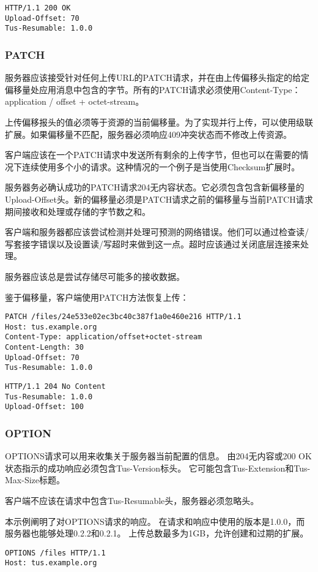 \documentclass[bachelor]{thesis-uestc}
\begin{document}
\begin{lstlisting}[title=Response]
HTTP/1.1 200 OK
Upload-Offset: 70
Tus-Resumable: 1.0.0
\end{lstlisting}

\subsubsection{PATCH}
服务器应该接受针对任何上传URL的PATCH请求，并在由上传偏移头指定的给定偏移量处应用消息中包含的字节。所有的PATCH请求必须使用Content-Type：application / offset + octet-stream。

上传偏移报头的值必须等于资源的当前偏移量。为了实现并行上传，可以使用级联扩展。如果偏移量不匹配，服务器必须响应409冲突状态而不修改上传资源。

客户端应该在一个PATCH请求中发送所有剩余的上传字节，但也可以在需要的情况下连续使用多个小的请求。这种情况的一个例子是当使用Checksum扩展时。

服务器务必确认成功的PATCH请求204无内容状态。它必须包含包含新偏移量的Upload-Offset头。新的偏移量必须是PATCH请求之前的偏移量与当前PATCH请求期间接收和处理或存储的字节数之和。

客户端和服务器都应该尝试检测并处理可预测的网络错误。他们可以通过检查读/写套接字错误以及设置读/写超时来做到这一点。超时应该通过关闭底层连接来处理。

服务器应该总是尝试存储尽可能多的接收数据。
\par 鉴于偏移量，客户端使用PATCH方法恢复上传：
\begin{lstlisting}[title=Request]
PATCH /files/24e533e02ec3bc40c387f1a0e460e216 HTTP/1.1
Host: tus.example.org
Content-Type: application/offset+octet-stream
Content-Length: 30
Upload-Offset: 70
Tus-Resumable: 1.0.0
\end{lstlisting}

\begin{lstlisting}[title=Response]
HTTP/1.1 204 No Content
Tus-Resumable: 1.0.0
Upload-Offset: 100
\end{lstlisting}

\subsubsection{OPTION}
OPTIONS请求可以用来收集关于服务器当前配置的信息。 由204无内容或200 OK状态指示的成功响应必须包含Tus-Version标头。 它可能包含Tus-Extension和Tus-Max-Size标题。

客户端不应该在请求中包含Tus-Resumable头，服务器必须忽略头。

本示例阐明了对OPTIONS请求的响应。 在请求和响应中使用的版本是1.0.0，而服务器也能够处理0.2.2和0.2.1。 上传总数最多为1GB，允许创建和过期的扩展。
\begin{lstlisting}[title=Request]
OPTIONS /files HTTP/1.1
Host: tus.example.org
\end{lstlisting}
\end{document}
